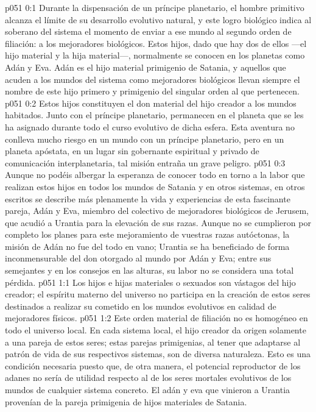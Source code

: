 \author{Lanonandec secundario}
\vs p051 0:1 Durante la dispensación de un príncipe planetario, el hombre primitivo alcanza el límite de su desarrollo evolutivo natural, y este logro biológico indica al soberano del sistema el momento de enviar a ese mundo al segundo orden de filiación: a los mejoradores biológicos. Estos hijos, dado que hay dos de ellos ---el hijo material y la hija material---, normalmente se conocen en los planetas como Adán y Eva. Adán es el hijo material primigenio de Satania, y aquellos que acuden a los mundos del sistema como mejoradores biológicos llevan siempre el nombre de este hijo primero y primigenio del singular orden al que pertenecen.
\vs p051 0:2 Estos hijos constituyen el don material del hijo creador a los mundos habitados. Junto con el príncipe planetario, permanecen en el planeta que se les ha asignado durante todo el curso evolutivo de dicha esfera. Esta aventura no conlleva mucho riesgo en un mundo con un príncipe planetario, pero en un planeta apóstata, en un lugar sin gobernante espiritual y privado de comunicación interplanetaria, tal misión entraña un grave peligro.
\vs p051 0:3 Aunque no podéis albergar la esperanza de conocer todo en torno a la labor que realizan estos hijos en todos los mundos de Satania y en otros sistemas, en otros escritos se describe más plenamente la vida y experiencias de esta fascinante pareja, Adán y Eva, miembro del colectivo de mejoradores biológicos de Jerusem, que acudió a Urantia para la elevación de sus razas. Aunque no se cumplieron por completo los planes para este mejoramiento de vuestras razas autóctonas, la misión de Adán no fue del todo en vano; Urantia se ha beneficiado de forma inconmensurable del don otorgado al mundo por Adán y Eva; entre sus semejantes y en los consejos en las alturas, su labor no se considera una total pérdida.
\vs p051 1:1 Los hijos e hijas materiales o sexuados son vástagos del hijo creador; el espíritu materno del universo no participa en la creación de estos seres destinados a realizar su cometido en los mundos evolutivos en calidad de mejoradores físicos.
\vs p051 1:2 Este orden material de filiación no es homogéneo en todo el universo local. En cada sistema local, el hijo creador da origen solamente a una pareja de estos seres; estas parejas primigenias, al tener que adaptarse al patrón de vida de sus respectivos sistemas, son de diversa naturaleza. Esto es una condición necesaria puesto que, de otra manera, el potencial reproductor de los adanes no sería de utilidad respecto al de los seres mortales evolutivos de los mundos de cualquier sistema concreto. El adán y eva que vinieron a Urantia provenían de la pareja primigenia de hijos materiales de Satania.

